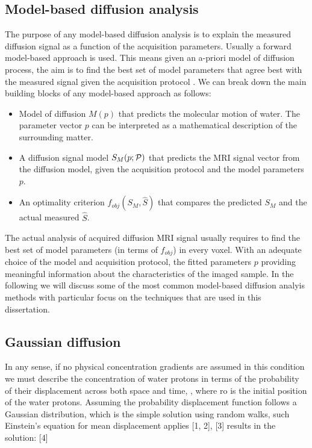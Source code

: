 \subsection*{Model-based diffusion analysis} 
The purpose of any model-based diffusion analysis is to explain the measured diffusion signal as a function of the acquisition parameters. Usually a forward model-based approach is used. This means given an a-priori model of diffusion process, the aim is to find the best set of model parameters that agree best with the measured signal given the acquisition protocol \prot{}. We can break down the main building blocks of any model-based approach as follows:  
\begin{itemize}
	\item Model of diffusion $M(p)$ that predicts the molecular motion of water. The parameter vector $p$ can be interpreted as a mathematical description of the surrounding matter. 
	\item A diffusion signal model $S_{M}(p;\mathcal{P})$ that predicts the MRI signal vector from the diffusion model, given the acquisition protocol \prot{} and the model parameters $p$. 
	\item An optimality criterion $f_{obj}(S_{M},\hat{S})$ that compares the predicted $S_{M}$ and the actual measured $\hat{S}$. 
\end{itemize}
The actual analysis of acquired diffusion MRI signal usually requires to find the best set of model parameters (in terms of $f_{obj}$) in every voxel. With an adequate choice of the model and acquisition protocol, the fitted parameters $p$ providing meaningful information about the characteristics of the imaged sample. In the following we will discuss some of the most common model-based diffusion analyis methods with particular focus on the techniques that are used in this dissertation. 

\subsection*{Gaussian diffusion}
In any sense, if no physical concentration gradients are assumed in this condition we must describe the concentration of water protons in terms of the probability of their displacement across both space and time,  , where ro is the initial position of the water protons. Assuming the probability displacement function follows a Gaussian distribution, which is the simple solution using random walks, such Einstein’s equation for mean displacement applies [1, 2],  
 									[3]
results in the solution:
 							[4]

